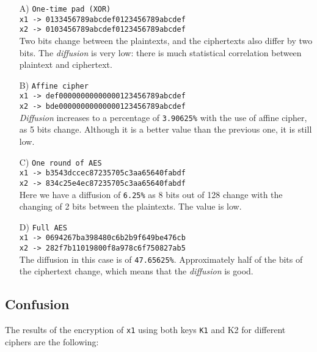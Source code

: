 \documentclass{article}
\begin{document}
\begin{itemize}
    \item [A)] \texttt{One-time pad (XOR)} \\
    \texttt{x1 -> 0133456789abcdef0123456789abcdef} \\
    \texttt{x2 -> 0103456789abcdef0123456789abcdef} \\
    Two bits change between the plaintexts, and the ciphertexts also differ by two bits. The \textit{diffusion} is very low: there is much statistical correlation between plaintext and ciphertext.
    
    \item [B)] \texttt{Affine cipher} \\
    \texttt{x1 -> def00000000000000123456789abcdef} \\
    \texttt{x2 -> bde00000000000000123456789abcdef} \\
    \textit{Diffusion} increases to a percentage of \texttt{3.90625\%} with the use of affine cipher, as 5 bits change. Although it is a better value than the previous one, it is still low.
    
    \item [C)] \texttt{One round of AES} \\
    \texttt{x1 -> b3543dccec87235705c3aa65640fabdf} \\
    \texttt{x2 -> 834c25e4ec87235705c3aa65640fabdf} \\
    Here we have a diffusion of \texttt{6.25\%} as 8 bits out of 128 change with the changing of 2 bits between the plaintexts. The value is low.
    
    \item [D)] \texttt{Full AES} \\
    \texttt{x1 -> 0694267ba398480c6b2b9f649be476cb} \\
    \texttt{x2 -> 282f7b11019800f8a978c6f750827ab5} \\
    The diffusion in this case is of \texttt{47.65625\%}. Approximately half of the bits of the ciphertext change, which means that the \textit{diffusion} is good.
    
\end{itemize}


\subsection{Confusion}
The results of the encryption of \texttt{x1} using both keys \texttt{K1} and {K2} for different ciphers are the following:
\end{document}
